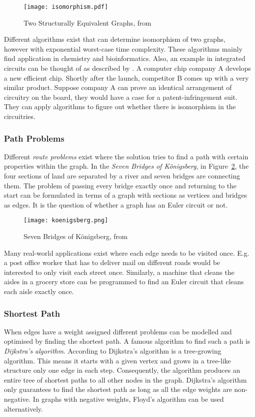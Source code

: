 \documentclass[final]{fhnwreport}       %
\begin{document}
\begin{figure}[H]
\centering
\texttt{[image: isomorphism.pdf]}
\caption{Two Structurally Equivalent Graphs, from \cite{gross_graph_2019}}
\label{fig:iso}
\end{figure}

Different algorithms exist that can determine isomorphism of two graphs, however with exponential worst-case time complexity. These algorithms mainly find application in chemistry and bioinformatics. Also, an example in integrated circuits can be thought of as described by \textcite{gross_graph_2019}. A computer chip company A develops a new efficient chip. Shortly after the launch, competitor B comes up with a very similar product. Suppose company A can prove an identical arrangement of circuitry on the board, they would have a case for a patent-infringement suit. They can apply algorithms to figure out whether there is isomorphism in the circuitries.

\subsubsection{Path Problems}
Different \emph{route problems} exist where the solution tries to find a path with certain properties within the graph. In the \emph{Seven Bridges of Königsberg}, in Figure~\ref{fig:konig}, the four sections of land are separated by a river and seven bridges are connecting them. The problem of passing every bridge exactly once and returning to the start can be formulated in terms of a graph with sections as vertices and bridges as edges. It is the question of whether a graph has an Euler circuit or not. 

\begin{figure}[H]
\centering
\texttt{[image: koenigsberg.png]}
\caption{Seven Bridges of Königsberg, from \cite{rosen_discrete_2012}}
\label{fig:konig}
\end{figure}

Many real-world applications exist where each edge needs to be visited once. E.g. a post office worker that has to deliver mail on different roads would be interested to only visit each street once. Similarly, a machine that cleans the aisles in a grocery store can be programmed to find an Euler circuit that cleans each aisle exactly once.

\subsubsection{Shortest Path}
When edges have a weight assigned different problems can be modelled and optimised by finding the shortest path. A famous algorithm to find such a path is \emph{Dijkstra’s algorithm}. According to \textcite{gross_graph_2019} Dijkstra's algorithm is a tree-growing algorithm. This means it starts with a given vertex and grows in a tree-like structure only one edge in each step. Consequently, the algorithm produces an entire tree of shortest paths to all other nodes in the graph. Dijkstra’s algorithm only guarantees to find the shortest path as long as all the edge weights are non-negative. In graphs with negative weights, Floyd’s algorithm can be used alternatively.
\end{document}
